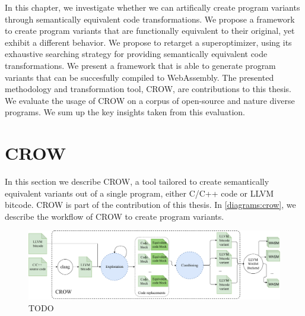 

\label{chapter:generation}



In this chapter, we investigate whether we can artifically create program variants through semantically equivalent code transformations. We propose a framework to create program variants that are functionally equivalent to their original, yet exhibit a different behavior.
We propose to retarget a superoptimizer, using its exhaustive searching strategy for providing semantically equivalent code transformations. We present a framework that is able to generate program variants that can be succesfully compiled to WebAssembly.
The presented methodology and transformation tool, CROW, are contributions to this thesis.
We evaluate the usage of CROW on a corpus of open-source and nature diverse programs. 
We sum up the key insights taken from this evaluation.


\section{CROW}
\label{section:crow}
In this section we describe CROW, a tool tailored to create semantically equivalent variants out of a single program, either C/C++ code or LLVM bitcode. CROW is part of the contribution of this thesis.
In \autoref{diagrams:crow}, we describe the workflow of CROW to create program variants.

\begin{figure}[h]
    \includegraphics[width=\linewidth]{diagrams/generation/crow.drawio.pdf}
    \caption{TODO}
    \label{diagrams:crow}
\end{figure}

